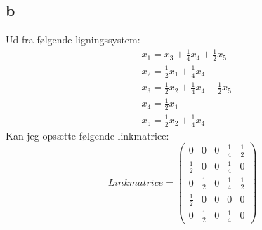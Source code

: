 \documentclass{article}
\begin{document}
\subsection*{b}
Ud fra følgende ligningssystem:
$$
\begin{aligned}
& x_1=x_3+\frac{1}{4} x_4+\frac{1}{2} x_5 \\
& x_2=\frac{1}{2} x_1+\frac{1}{4} x_4 \\
& x_3=\frac{1}{2} x_2+\frac{1}{4} x_4+\frac{1}{2} x_5 \\
& x_4=\frac{1}{2} x_1 \\
& x_5=\frac{1}{2} x_2+\frac{1}{4} x_4
\end{aligned}
$$
Kan jeg opsætte følgende linkmatrice:
$$
Linkmatrice =
\left(\begin{array}{lllll}
0 & 0 & 0 & \frac{1}{4} & \frac{1}{2} \\
\frac{1}{2} & 0 & 0 & \frac{1}{4} & 0 \\
0 & \frac{1}{2} & 0 & \frac{1}{4} & \frac{1}{2} \\
\frac{1}{2} & 0 & 0 & 0 & 0 \\
0 & \frac{1}{2} & 0 & \frac{1}{4} & 0
\end{array}\right)
$$
\end{document}
